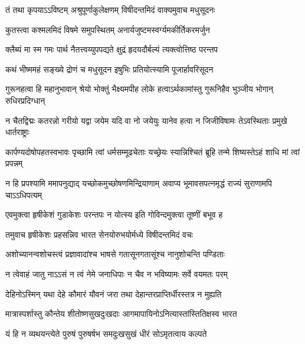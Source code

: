\twolineshloka
{तं तथा कृपयाऽऽविष्टम् अश्रुपूर्णाकुलेक्षणम्}
{विषीदन्तमिदं वाक्यमुवाच मधुसूदनः}%

\twolineshloka
{कुतस्त्वा कश्मलमिदं विषमे समुपस्थितम्}
{अनार्यजुष्टमस्वर्ग्यमकीर्तिकरमर्जुन}%

\twolineshloka
{क्लैब्यं मा स्म गमः पार्थ नैतत्त्वय्युपपद्यते}
{क्षुद्रं हृदयदौर्बल्यं त्यक्त्वोत्तिष्ठ परन्तप}%

\twolineshloka
{कथं भीष्ममहं सङ्ख्ये द्रोणं च मधुसूदन}
{इषुभिः प्रतियोत्स्यामि पूजार्हावरिसूदन}%

\fourlineindentedshloka
{गुरूनहत्वा हि महानुभावान्}
{श्रेयो भोक्तुं भैक्ष्यमपीह लोके}
{हत्वाऽर्थकामांस्तु गुरूनिहैव}
{भुञ्जीय भोगान् रुधिरप्रदिग्धान्}%

\fourlineindentedshloka
{न चैतद्विद्मः कतरन्नो गरीयो}
{यद्वा जयेम यदि वा नो जयेयुः}
{यानेव हत्वा न जिजीविषामः}
{तेऽवस्थिताः प्रमुखे धार्तराष्ट्राः}%

\fourlineindentedshloka
{कार्पण्यदोषोपहतस्वभावः}
{पृच्छामि त्वां धर्मसम्मूढचेताः}
{यच्छ्रेयः स्यान्निश्चितं ब्रूहि तन्मे}
{शिष्यस्तेऽहं शाधि मां त्वां प्रपन्नम्}%

\fourlineindentedshloka
{न हि प्रपश्यामि ममापनुद्याद्}
{यच्छोकमुच्छोषणमिन्द्रियाणाम्}
{अवाप्य भूमावसपत्नमृद्धं}
{राज्यं सुराणामपि चाऽऽधिपत्यम्}%

\twolineshloka
{एवमुक्त्वा हृषीकेशं गुडाकेशः परन्तपः}
{न योत्स्य इति गोविन्दमुक्त्वा तूष्णीं बभूव ह}%

\twolineshloka
{तमुवाच हृषीकेशः प्रहसन्निव भारत}
{सेनयोरुभयोर्मध्ये विषीदन्तमिदं वचः}%

\twolineshloka
{अशोच्यानन्वशोचस्त्वं प्रज्ञावादांश्च भाषसे}
{गतासूनगतासूंश्च नानुशोचन्ति पण्डिताः}%

\twolineshloka
{न त्वेवाहं जातु नाऽऽसं न त्वं नेमे जनाधिपाः}
{न चैव न भविष्यामः सर्वे वयमतः परम्}%

\twolineshloka
{देहिनोऽस्मिन् यथा देहे कौमारं यौवनं जरा}
{तथा देहान्तरप्राप्तिर्धीरस्तत्र न मुह्यति}%

\twolineshloka
{मात्रास्पर्शास्तु कौन्तेय शीतोष्णसुखदुःखदाः}
{आगमापायिनोऽनित्यास्तांस्तितिक्षस्व भारत}%

\twolineshloka
{यं हि न व्यथयन्त्येते पुरुषं पुरुषर्षभ}
{समदुःखसुखं धीरं सोऽमृतत्वाय कल्पते}%


